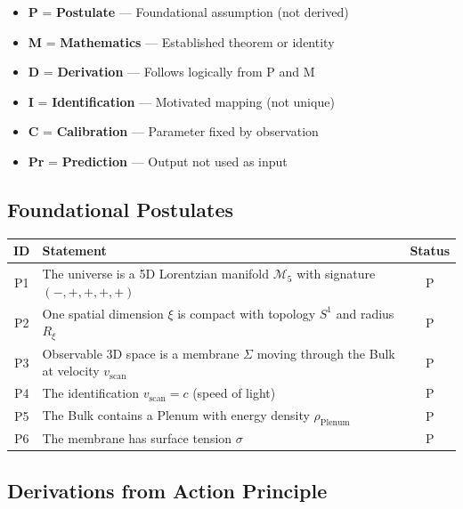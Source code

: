 \begin{tcolorbox}[colback=gray!10,colframe=gray!70,title=Classification Legend]
\begin{itemize}
    \item \textbf{P} = \textbf{Postulate} — Foundational assumption (not derived)
    \item \textbf{M} = \textbf{Mathematics} — Established theorem or identity
    \item \textbf{D} = \textbf{Derivation} — Follows logically from P and M
    \item \textbf{I} = \textbf{Identification} — Motivated mapping (not unique)
    \item \textbf{C} = \textbf{Calibration} — Parameter fixed by observation
    \item \textbf{Pr} = \textbf{Prediction} — Output not used as input
\end{itemize}
\end{tcolorbox}

\subsection{Foundational Postulates}

\begin{center}
\begin{tabular}{|c|p{10cm}|c|}
\hline
\textbf{ID} & \textbf{Statement} & \textbf{Status} \\
\hline
P1 & The universe is a 5D Lorentzian manifold $\mathcal{M}_5$ with signature $(-,+,+,+,+)$ & P \\
\hline
P2 & One spatial dimension $\xi$ is compact with topology $S^1$ and radius $R_\xi$ & P \\
\hline
P3 & Observable 3D space is a membrane $\Sigma$ moving through the Bulk at velocity $v_{\text{scan}}$ & P \\
\hline
P4 & The identification $v_{\text{scan}} = c$ (speed of light) & P \\
\hline
P5 & The Bulk contains a Plenum with energy density $\rho_{\text{Plenum}}$ & P \\
\hline
P6 & The membrane has surface tension $\sigma$ & P \\
\hline
\end{tabular}
\end{center}

\subsection{Derivations from Action Principle}

